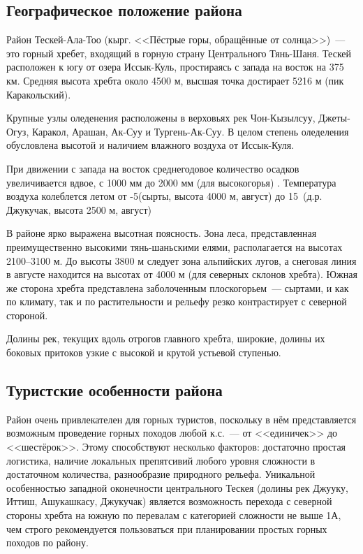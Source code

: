 \clearpage

\subsection{Географическое положение района}

Район Тескей-Ала-Тоо (кырг. <<Пёстрые горы, обращённые от солнца>>)~--- это горный хребет, входящий в горную страну Центрального Тянь-Шаня. Тескей расположен к югу от озера Иссык-Куль, простираясь с запада на восток на 375 км. Средняя высота хребта около 4500 м, высшая точка достирает 5216 м (пик Каракольский).

Крупные узлы оледенения расположены в верховьях рек Чон-Кызылсуу, Джеты-Огуз, Каракол, Арашан, Ак-Суу и Тургень-Ак-Суу. В целом степень оледеления обусловлена высотой и наличием влажного воздуха от Иссык-Куля.

При движении с запада на восток среднегодовое количество осадков увеличивается вдвое, с 1000 мм до 2000 мм (для высокогорья) \cite{rodina2012}. Температура воздуха колеблется летом от -5\degree (сырты, высота 4000 м, август) до 15\degree~(д.р. Джукучак, высота 2500 м, август)

В районе ярко выражена высотная поясность. Зона леса, представленная преимущественно высокими тянь-шаньскими елями, располагается на высотах 2100--3100 м. До высоты 3800 м следует зона альпийских лугов, а снеговая линия в августе находится на высотах от 4000 м (для северных склонов хребта). Южная же сторона хребта представлена заболоченным плоскогорьем~--- сыртами, и как по климату, так и по растительности и рельефу резко контрастирует с северной стороной.

Долины рек, текущих вдоль отрогов главного хребта, широкие, долины их боковых притоков узкие с высокой и крутой устьевой ступенью.

\subsection{Туристские особенности района}
Район очень привлекателен для горных туристов, поскольку в нём представляется возможным проведение горных походов любой к.с.~--- от <<единичек>> до <<шестёрок>>. Этому способствуют несколько факторов: достаточно простая логистика, наличие локальных препятсивий любого уровня сложности в достаточном количества, разнообразие природного рельефа. Уникальной особенностью западной оконечности центрального Тескея (долины рек Джууку, Иттиш, Ашукашкасу, Джукучак) является возможность перехода с северной стороны хребта на южную по перевалам с категорией сложности не выше 1А, чем строго рекомендуется пользоваться при планировании простых горных походов по району.

